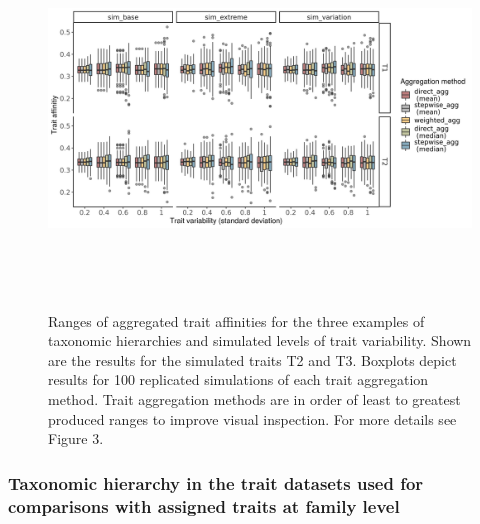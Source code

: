 \documentclass[12pt]{article}
\begin{document}
\begin{figure}[H]
    \centering
    \includegraphics[width=16.5cm, height=10cm]{Overview_sim_results_T2_T3.png}
    \caption{Ranges of aggregated trait affinities for the three examples of taxonomic hierarchies and simulated levels of trait variability. Shown are the results for the simulated traits T2 and T3. Boxplots depict results for 100 replicated simulations of each trait aggregation method. Trait aggregation methods are in order of least to greatest produced ranges to improve visual inspection. For more details see Figure 3.}%
    \label{fig:overview_sim_results_T2_T3}
  \end{figure}

\subsubsection*{Taxonomic hierarchy in the trait datasets used for comparisons with assigned traits at family level}
\label{sec:taxonomic_hierarchy}
\end{document}
